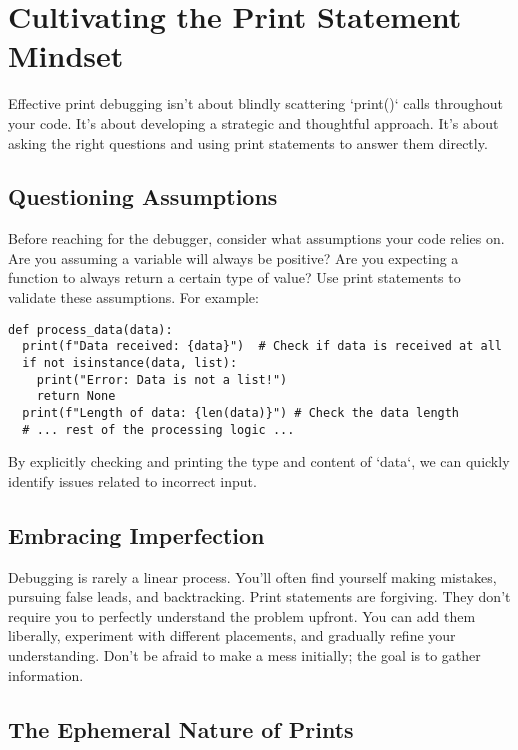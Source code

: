 \documentclass{article}
\begin{document}
\section{Cultivating the Print Statement Mindset}

Effective print debugging isn't about blindly scattering `print()` calls throughout your code. It's about developing a strategic and thoughtful approach.  It's about asking the right questions and using print statements to answer them directly.

\subsection*{Questioning Assumptions}

Before reaching for the debugger, consider what assumptions your code relies on.  Are you assuming a variable will always be positive?  Are you expecting a function to always return a certain type of value?  Use print statements to validate these assumptions.  For example:

\begin{verbatim}
def process_data(data):
  print(f"Data received: {data}")  # Check if data is received at all
  if not isinstance(data, list):
    print("Error: Data is not a list!")
    return None
  print(f"Length of data: {len(data)}") # Check the data length
  # ... rest of the processing logic ...
\end{verbatim}

By explicitly checking and printing the type and content of `data`, we can quickly identify issues related to incorrect input.

\subsection*{Embracing Imperfection}

Debugging is rarely a linear process. You'll often find yourself making mistakes, pursuing false leads, and backtracking.  Print statements are forgiving.  They don't require you to perfectly understand the problem upfront.  You can add them liberally, experiment with different placements, and gradually refine your understanding.  Don't be afraid to make a mess initially; the goal is to gather information.

\subsection*{The Ephemeral Nature of Prints}
\end{document}
